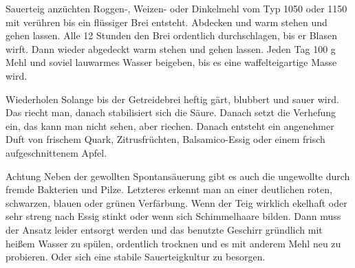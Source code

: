 \begin{recipe}{Sauerteig anzüchten}
	 Roggen-, Weizen- oder Dinkelmehl vom Typ 1050 oder 1150 mit 
	 verühren bis ein flüssiger Brei entsteht. Abdecken und warm stehen und gehen lassen. Alle 12 Stunden den Brei ordentlich durchschlagen, bis er Blasen wirft. Dann wieder abgedeckt warm stehen und gehen lassen.
	Jeden Tag 100 g Mehl und soviel lauwarmes Wasser beigeben, bis es eine waffelteigartige Masse wird.
	\item{Wiederholen} Solange bis der Getreidebrei heftig gärt, blubbert und sauer wird. Das riecht man, danach stabilisiert sich die Säure. Danach setzt die Verhefung ein, das kann man nicht sehen, aber riechen. Danach entsteht ein angenehmer Duft von frischem Quark, Zitrusfrüchten, Balsamico-Essig oder einem frisch aufgeschnittenem Apfel.
	\item[Achtung] Neben der gewollten Spontansäuerung gibt es auch die ungewollte durch fremde Bakterien und Pilze. Letzteres erkennt man an einer deutlichen roten, schwarzen, blauen oder grünen Verfärbung. Wenn der Teig wirklich ekelhaft oder sehr streng nach Essig stinkt oder wenn sich Schimmelhaare bilden. Dann muss der Ansatz leider entsorgt werden und das benutzte Geschirr gründlich mit heißem Wasser zu spülen, ordentlich trocknen und es mit anderem Mehl neu zu probieren. Oder sich eine stabile Sauerteigkultur zu besorgen.
\end{recipe}